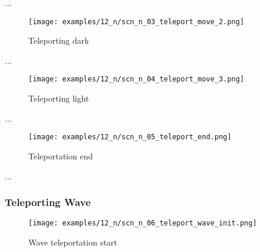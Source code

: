 ...

\clearpage %

\noindent
\begin{figure}[!h]
\texttt{[image: examples/12\_n/scn\_n\_03\_teleport\_move\_2.png]}
\caption{Teleporting dark}
\label{fig:scn_n_03_teleport_move_2}
\end{figure}

...

\clearpage %

\noindent
\begin{figure}[!h]
\texttt{[image: examples/12\_n/scn\_n\_04\_teleport\_move\_3.png]}
\caption{Teleporting light}
\label{fig:scn_n_04_teleport_move_3}
\end{figure}

...

\clearpage %

\noindent
\begin{figure}[!h]
\texttt{[image: examples/12\_n/scn\_n\_05\_teleport\_end.png]}
\caption{Teleportation end}
\label{fig:scn_n_05_teleport_end}
\end{figure}

...


\clearpage %

\subsubsection*{Teleporting Wave}

\noindent
\begin{figure}[!h]
\texttt{[image: examples/12\_n/scn\_n\_06\_teleport\_wave\_init.png]}
\caption{Wave teleportation start}
\label{fig:scn_n_06_teleport_wave_init}
\end{figure}

